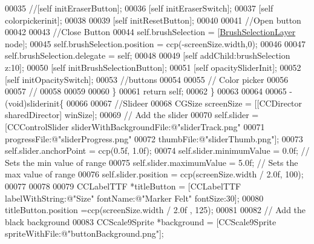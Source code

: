 \begin{DoxyCode}
00035         \textcolor{comment}{//[self initEraserButton];}
00036         [\textcolor{keyword}{self} initEraserSwitch];
00037         [\textcolor{keyword}{self} colorpickerinit];
00038         
00039         [\textcolor{keyword}{self} initResetButton];
00040         
00041         \textcolor{comment}{//Open button}
00042         
00043         \textcolor{comment}{//Close Button}
00044         \textcolor{keyword}{self}.brushSelection = [\hyperlink{interface_brush_selection_layer}{BrushSelectionLayer} node];
00045         \textcolor{keyword}{self}.brushSelection.position = ccp(-screenSize.width,0);
00046         
00047         \textcolor{keyword}{self}.brushSelection.delegate = \textcolor{keyword}{self};
00048         
00049         [\textcolor{keyword}{self} addChild:brushSelection z:10];
00050         [\textcolor{keyword}{self} initBrushSelectionButton];
00051         [\textcolor{keyword}{self} opacitySliderInit];
00052         [\textcolor{keyword}{self} initOpacitySwitch];
00053         \textcolor{comment}{//buttons}
00054         
00055         \textcolor{comment}{// Color picker}
00056         
00057         \textcolor{comment}{//}
00058         
00059 
00060     \}
00061     \textcolor{keywordflow}{return} \textcolor{keyword}{self};
00062 \}
00063 
00064 
00065 - (void)sliderinit\{
00066     
00067     \textcolor{comment}{//Slideer}
00068     CGSize screenSize = [[CCDirector sharedDirector] winSize];
00069     \textcolor{comment}{// Add the slider}
00070     \textcolor{keyword}{self}.slider                     = [CCControlSlider sliderWithBackgroundFile:@"sliderTrack.png"
00071                                                                    progressFile:@"sliderProgress.png"
00072                                                                       thumbFile:@"sliderThumb.png"];
00073     \textcolor{keyword}{self}.slider.anchorPoint              = ccp(0.5f, 1.0f);
00074     \textcolor{keyword}{self}.slider.minimumValue             = 0.0f; \textcolor{comment}{// Sets the min value of range}
00075     \textcolor{keyword}{self}.slider.maximumValue             = 5.0f; \textcolor{comment}{// Sets the max value of range}
00076     \textcolor{keyword}{self}.slider.position                 = ccp(screenSize.width / 2.0f, 100);
00077     
00078     
00079     CCLabelTTF *titleButton = [CCLabelTTF labelWithString:@"Size" fontName:@"Marker Felt" fontSize:30];
00080     titleButton.position =ccp(screenSize.width / 2.0f , 125);
00081     
00082     \textcolor{comment}{// Add the black background}
00083     CCScale9Sprite *background = [CCScale9Sprite spriteWithFile:@"buttonBackground.png"];

\end{DoxyCode}
